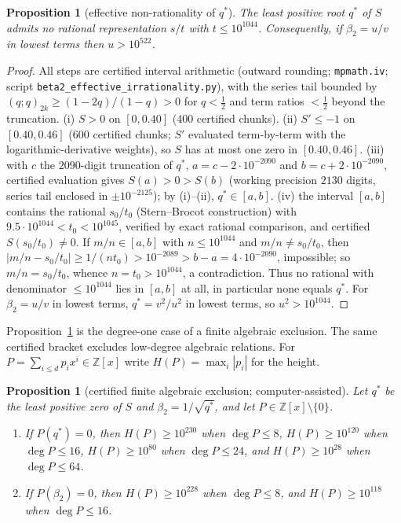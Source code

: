 \documentclass[11pt]{article}
\theoremstyle{plain}
\newtheorem{proposition}[theorem]{Proposition}
\theoremstyle{definition}
\theoremstyle{remark}
\newcommand{\Z}{\mathbb{Z}}
\begin{document}
\begin{proposition}[effective non-rationality of $q^\ast$]
\label{prop:effective}
The least positive root $q^\ast$ of $S$ admits no rational representation $s/t$ with
$t\le10^{1044}$. Consequently, if $\beta_2=u/v$ in lowest terms then $u>10^{522}$.
\end{proposition}

\begin{proof}
All steps are certified interval arithmetic (outward rounding; \texttt{mpmath.iv}; script
\texttt{beta2\_effective\_irrationality.py}), with the series tail bounded by
$(q;q)_{2k}\ge(1-2q)/(1-q)>0$ for $q<\tfrac12$ and term ratios $<\tfrac12$ beyond the truncation.
\textup{(i)} $S>0$ on $[0,0.40]$ ($400$ certified chunks). \textup{(ii)} $S'\le-1$ on $[0.40,0.46]$
($600$ certified chunks; $S'$ evaluated term-by-term with the logarithmic-derivative weights), so
$S$ has at most one zero in $[0.40,0.46]$. \textup{(iii)} with $c$ the
$2090$-digit truncation of $q^\ast$, $a=c-2\cdot10^{-2090}$ and $b=c+2\cdot10^{-2090}$, certified
evaluation gives $S(a)>0>S(b)$ (working precision $2130$ digits, series tail enclosed in
$\pm10^{-2125}$); by \textup{(i)}--\textup{(ii)}, $q^\ast\in[a,b]$. \textup{(iv)} the interval
$[a,b]$ contains the rational $s_0/t_0$ (Stern--Brocot construction) with
$9.5\cdot10^{1044}<t_0<10^{1045}$, verified by exact rational comparison, and certified
$S(s_0/t_0)\ne0$. If $m/n\in[a,b]$ with $n\le10^{1044}$ and $m/n\ne s_0/t_0$, then
$|m/n-s_0/t_0|\ge1/(nt_0)>10^{-2089}>b-a=4\cdot10^{-2090}$, impossible; so $m/n=s_0/t_0$, whence
$n=t_0>10^{1044}$, a contradiction. Thus no rational with denominator $\le10^{1044}$ lies in
$[a,b]$ at all, in particular none equals $q^\ast$. For $\beta_2=u/v$ in lowest terms,
$q^\ast=v^2/u^2$ in lowest terms, so $u^2>10^{1044}$.
\end{proof}

Proposition~\ref{prop:effective} is the degree-one case of a finite algebraic exclusion. The same
certified bracket excludes low-degree algebraic relations. For $P=\sum_{i\le d}p_ix^i\in\Z[x]$ write
$H(P)=\max_i|p_i|$ for the height.

\begin{proposition}[certified finite algebraic exclusion; computer-assisted]
\label{prop:finiteexcl}
Let $q^\ast$ be the least positive zero of $S$ and $\beta_2=1/\sqrt{q^\ast}$, and let
$P\in\Z[x]\setminus\{0\}$.
\begin{enumerate}[label=\textup{(\roman*)},leftmargin=2.2em,itemsep=0.1em,topsep=0.2em]
\item If $P(q^\ast)=0$, then $H(P)\ge10^{230}$ when $\deg P\le8$, $H(P)\ge10^{120}$ when
$\deg P\le16$, $H(P)\ge10^{80}$ when $\deg P\le24$, and $H(P)\ge10^{28}$ when $\deg P\le64$.
\item If $P(\beta_2)=0$, then $H(P)\ge10^{228}$ when $\deg P\le8$, and $H(P)\ge10^{118}$ when
$\deg P\le16$.
\end{enumerate}
\end{proposition}
\end{document}
